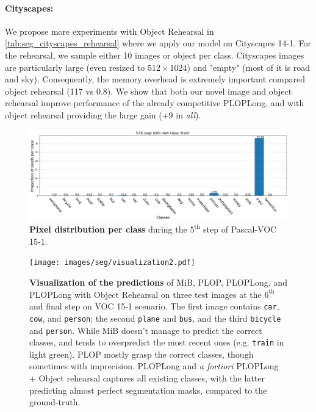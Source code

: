 \paragraph{Cityscapes:} We propose more experiments with Object Rehearsal in
\autoref{tab:seg_cityscapes_rehearsal} where we apply our model on Cityscapes 14-1. For the rehearsal,
we sample either 10 images or object per class. Cityscapes images are particularly large (even
resized to $512 \times 1024$)  and "empty" (most of it is road and sky). Consequently, the memory
overhead is extremely important compared object rehearsal (117 vs 0.8). We show that both our novel
image and object rehearsal improve performance of the already competitive PLOPLong, and with object
rehearsal providing the large gain (+9 \pp in \textit{all}).




\begin{figure}
    \centering
    \includegraphics[width=\linewidth]{images/seg/distribution_5step_voc.png}
    \vspace*{-0.3cm}
    \caption{\textbf{Pixel distribution per class} during the $5^{\text{th}}$ step of Pascal-VOC
        15-1.}
    \label{fig:seg_distribution_voc_5th}
\end{figure}

\begin{figure}
    \centering
    \texttt{[image: images/seg/visualization2.pdf]}
    \caption{\textbf{Visualization of the predictions} of MiB, PLOP, PLOPLong, and PLOPLong with Object
        Rehearsal on three test images at the $6^\text{th}$ and final step on VOC 15-1 scenario. The
        first image contains \texttt{car}, \texttt{cow}, and \texttt{person}; the second
        \texttt{plane} and \texttt{bus}, and the third \texttt{bicycle} and \texttt{person}. While
        MiB doesn't manage to predict the correct classes, and tends to overpredict the most recent
        ones (e.g. \texttt{train} in light green). PLOP mostly grasp the correct classes, though
        sometimes with imprecision. PLOPLong and \textit{a fortiori} PLOPLong + Object rehearsal
        captures all existing classes, with the latter predicting almost perfect segmentation masks,
        compared to the ground-truth.}
    \label{fig:seg_visualization}
\end{figure}

